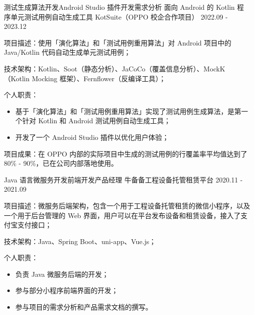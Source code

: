 \begin{cventries}
  \cventry
    {测试生成算法开发{\enskip\cdotp\enskip}Android Studio 插件开发{\enskip\cdotp\enskip}需求分析} %
    {面向 Android 的 Kotlin 程序单元测试用例自动生成工具 KotSuite（OPPO 校企合作项目）} %
    {2022.09 - 2023.12} %
    {} %
    {
      \begin{cvitems} %
        \item {项目描述：使用「演化算法」和「测试用例重用算法」对 Android 项目中的 Java/Kotlin 代码自动生成单元测试用例；}
        \item {技术架构：Kotlin、Soot（静态分析）、JaCoCo（覆盖信息分析）、MockK（Kotlin Mocking 框架）、Fernflower（反编译工具）；}
        \item {个人职责：}
          \begin{itemize}
            \item {基于「演化算法」和「测试用例重用算法」实现了测试用例生成算法，是第一个针对 Kotlin 和 Android 测试用例自动生成工具；}
            \item {开发了一个 Android Studio 插件以优化用户体验；}
          \end{itemize}
        \item {项目成果：在 OPPO 内部的实际项目中生成的测试用例的行覆盖率平均值达到了 80\% - 90\%，已在公司内部落地使用。}
      \end{cvitems}
    }

  \cventry
    {Java 语言微服务开发{\enskip\cdotp\enskip}前端开发{\enskip\cdotp\enskip}产品经理} %
    {牛备备工程设备托管租赁平台} %
    {2020.11 - 2021.09} %
    {} %
    {
      \begin{cvitems}
        \item {项目描述：微服务后端架构，包含一个用于工程设备托管租赁的微信小程序，以及一个用于后台管理的 Web 界面，用户可以在平台发布设备和租赁设备，接入了支付宝支付接口；}
        \item {技术架构：Java、Spring Boot、uni-app、Vue.js；}
        \item {个人职责：}
          \begin{itemize}
            \item {负责 Java 微服务后端的开发；}
            \item {参与部分小程序前端界面的开发；}
            \item {参与项目的需求分析和产品需求文档的撰写。}
          \end{itemize}
      \end{cvitems}
    }


\end{cventries}

